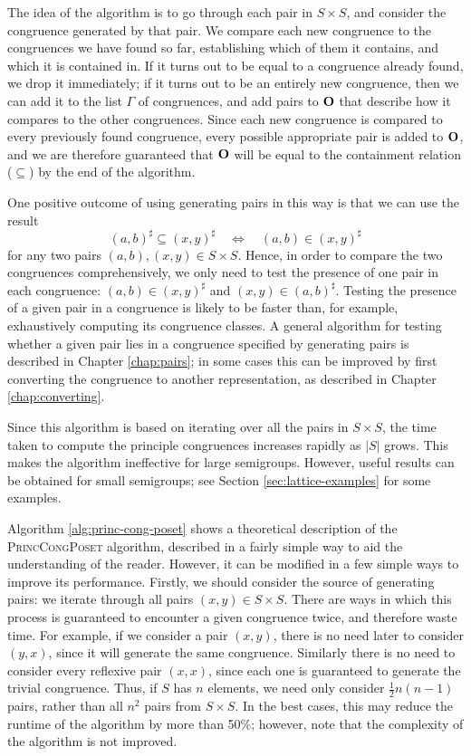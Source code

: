 The idea of the algorithm is to go through each pair in $S \times S$, and
consider the congruence generated by that pair.  We compare each new congruence
to the congruences we have found so far, establishing which of them it contains,
and which it is contained in.  If it turns out to be equal to a congruence
already found, we drop it immediately; if it turns out to be an entirely new
congruence, then we can add it to the list $\Gamma$ of congruences, and add
pairs to $\mathbf{O}$ that describe how it compares to the other congruences.  Since
each new congruence is compared to every previously found congruence, every
possible appropriate pair is added to $\mathbf{O}$, and we are therefore guaranteed
that $\mathbf{O}$ will be equal to the containment relation ($\subseteq$) by the end of
the algorithm.

One positive outcome of using generating pairs in this way is that we can use
the result
$$(a,b)^\sharp \subseteq (x,y)^\sharp \quad\iff\quad (a,b) \in (x,y)^\sharp$$
for any two pairs $(a,b), (x,y) \in S \times S$.  Hence, in order to compare the
two congruences comprehensively, we only need to test the presence of one pair
in each congruence: $(a,b) \in (x,y)^\sharp$ and $(x,y) \in (a,b)^\sharp$.
Testing the presence of a given pair in a congruence is likely to be faster
than, for example, exhaustively computing its congruence classes.  A general
algorithm for testing whether a given pair lies in a congruence specified by
generating pairs is described in Chapter \ref{chap:pairs}; in some cases this
can be improved by first converting the congruence to another representation, as
described in Chapter \ref{chap:converting}.

Since this algorithm is based on iterating over all the pairs in $S \times S$,
the time taken to compute the principle congruences increases rapidly as $|S|$
grows.  This makes the algorithm ineffective for large semigroups.  However,
useful results can be obtained for small semigroups; see Section
\ref{sec:lattice-examples} for some examples.

Algorithm \ref{alg:princ-cong-poset} shows a theoretical description of the
\textsc{PrincCongPoset} algorithm, described in a fairly simple way to aid the
understanding of the reader.  However, it can be modified in a few simple ways
to improve its performance.  Firstly, we should consider the source of
generating pairs: we iterate through all pairs $(x,y) \in S \times S$.  There
are ways in which this process is guaranteed to encounter a given congruence
twice, and therefore waste time.  For example, if we consider a pair $(x,y)$,
there is no need later to consider $(y,x)$, since it will generate the same
congruence.  Similarly there is no need to consider every reflexive pair
$(x,x)$, since each one is guaranteed to generate the trivial congruence.  Thus,
if $S$ has $n$ elements, we need only consider $\frac{1}{2}n(n-1)$ pairs, rather
than all $n^2$ pairs from $S \times S$.  In the best cases, this may reduce the
runtime of the algorithm by more than 50\%; however, note that the complexity of
the algorithm is not improved.

